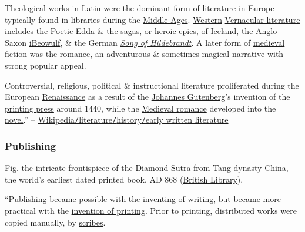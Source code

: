 \documentclass[oneside]{book}
\numberwithin{equation}{section}
\begin{document}
Theological works in Latin were the dominant form of \href{https://en.wikipedia.org/wiki/Mediaeval_literature#Types_of_writing}{literature} in Europe typically found in libraries during the \href{https://en.wikipedia.org/wiki/Middle_Ages}{Middle Ages}. \href{https://en.wikipedia.org/wiki/Western_culture}{Western} \href{https://en.wikipedia.org/wiki/Vernacular_literature}{Vernacular literature} includes the \href{https://en.wikipedia.org/wiki/Poetic_Edda}{Poetic Edda} \& the \href{https://en.wikipedia.org/wiki/Sagas}{sagas}, or heroic epics, of Iceland, the Anglo-Saxon \href{https://en.wikipedia.org/wiki/Beowulf}{iBeowulf}, \& the German \href{https://en.wikipedia.org/wiki/Song_of_Hildebrandt}{\textit{Song of Hildebrandt}}. A later form of \href{https://en.wikipedia.org/wiki/Mediaeval_literature}{medieval fiction} was the \href{https://en.wikipedia.org/wiki/Romance_(heroic_literature)}{romance}, an adventurous \& sometimes magical narrative with strong popular appeal.

Controversial, religious, political \& instructional literature proliferated during the European \href{https://en.wikipedia.org/wiki/Renaissance}{Renaissance} as a result of the \href{https://en.wikipedia.org/wiki/Johannes_Gutenberg}{Johannes Gutenberg}'s invention of the \href{https://en.wikipedia.org/wiki/Printing_press}{printing press} around 1440, while the \href{https://en.wikipedia.org/wiki/Medieval_romance}{Medieval romance} developed into the \href{https://en.wikipedia.org/wiki/Novel}{novel}.'' -- \href{https://en.wikipedia.org/wiki/Literature#Early_written_literature}{Wikipedia\texttt{/}literature\texttt{/}history\texttt{/}early written literature}

\subsubsection{Publishing}
\textsf{Fig. the intricate frontispiece of the \href{https://en.wikipedia.org/wiki/Diamond_Sutra}{Diamond Sutra} from \href{https://en.wikipedia.org/wiki/Tang_dynasty}{Tang dynasty} China, the world's earliest dated printed book, AD 868 (\href{https://en.wikipedia.org/wiki/British_Library}{British Library}).}

``Publishing became possible with the \href{https://en.wikipedia.org/wiki/History_of_writing}{inventing of writing}, but became more practical with the \href{https://en.wikipedia.org/wiki/History_of_printing}{invention of printing}. Prior to printing, distributed works were copied manually, by \href{https://en.wikipedia.org/wiki/Scribe}{scribes}.
\end{document}
